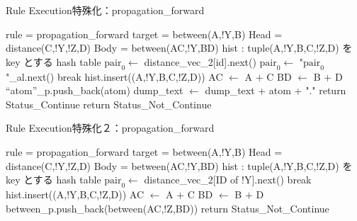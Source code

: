 \begin{algorithm}
    \caption{Rule Execution特殊化：propagation\_forward}
\begin{algorithmic}
    \scriptsize
    \Require rule = propagation\_forward
    \Require target = between(A,!Y,B) 
    \Require Head = {distance(C,!Y,!Z,D)}
    \Require Body = {between(AC,!Y,BD)}
    \Require hist : tuple(A,!Y,B,C,!Z,D) を key とする hash table 
             
                \State $\text{pair}_0 \gets$ distance\_vec\_2[id].next() 
            \Else
                \State $\text{pair}_0 \gets$ "$\text{pair}_0$"\_al.next()
            \EndIf
             
                \State break
            \EndIf
                \State hist.insert((A,!Y,B,C,!Z,D))
                \State AC $\gets$ A $+$ C
                \State BD $\gets$ B $+$ D
                        \State ``atom''\_p.push\_back(atom)
                    \Else {}
                        \State dump\_text $\gets$ dump\_text + atom + "."
                    \EndIf
                \EndFor
                    \State return Status\_Continue
                \EndIf
            \EndIf
        \EndWhile
        \State return Status\_Not\_Continue
    \EndProcedure
\end{algorithmic}
\end{algorithm}

\begin{algorithm}
    \caption{Rule Execution特殊化２：propagation\_forward}
\begin{algorithmic}
    \scriptsize
    \Require rule = propagation\_forward
    \Require target = between(A,!Y,B) 
    \Require Head = {distance(C,!Y,!Z,D)}
    \Require Body = {between(AC,!Y,BD)}
    \Require hist : tuple(A,!Y,B,C,!Z,D) を key とする hash table 
            \State $\text{pair}_0 \gets$ distance\_vec\_2[ID of !Y].next() 
             
                \State break
            \EndIf
                \State hist.insert((A,!Y,B,C,!Z,D))
                \State AC $\gets$ A $+$ C
                \State BD $\gets$ B $+$ D
                \State between\_p.push\_back(between(AC,!Z,BD))
            \EndIf
        \EndWhile
        \State return Status\_Not\_Continue
    \EndProcedure
\end{algorithmic}
\end{algorithm}

